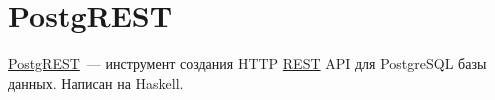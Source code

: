 \section{PostgREST}

\href{http://postgrest.com/}{PostgREST}~--- инструмент создания HTTP \href{https://ru.wikipedia.org/wiki/REST}{REST} API для PostgreSQL базы данных. Написан на Haskell.
